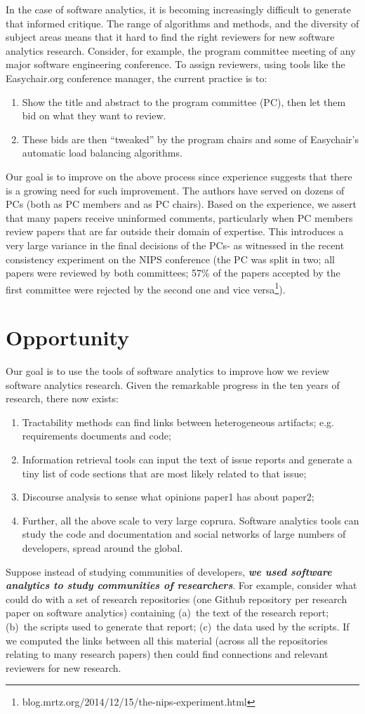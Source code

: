 \documentclass[journal]{IEEEtran}
\newcommand{\be}{\begin{enumerate}}
\newcommand{\ee}{\end{enumerate}}
\begin{document}
In the case of software analytics, it is becoming increasingly difficult
to generate that informed critique. The range of algorithms and methods,
and the diversity of subject areas means that it hard to find the right
reviewers for new software analytics research.  Consider, for example, 
the program committee meeting of any major software
engineering conference. To assign reviewers, using tools
like the Easychair.org conference manager, the current practice is to:
\be
\item
Show the title and abstract to the program committee (PC), then let them bid on what they want to review. 
\item
These bids are then ``tweaked'' by the program chairs
and some of Easychair's automatic load balancing algorithms.
\ee
Our goal is to improve on the above process since
experience suggests that there is a growing need for such improvement.
The authors have served on dozens of PCs
(both as  PC members and as PC chairs). Based on the experience, we assert that many papers
receive uninformed
comments, particularly when PC members   review papers that are far outside their domain of expertise.
This introduces a very large variance in the final decisions of the PCs- as witnessed in the  recent  
consistency experiment on the NIPS conference (the PC was split in two; all papers were reviewed by both committees; 57\% of the papers accepted by the first committee were rejected by the second one and vice versa\footnote{blog.mrtz.org/2014/12/15/the-nips-experiment.html}).


\section{Opportunity}
Our  goal is to use the tools of software analytics to improve how we review
software analytics research. 
Given  the remarkable progress  in the ten years of research, 
there now exists:
\be
\item
Tractability methods can find links between heterogeneous artifacts; e.g. requirements
documents and code;
\item
Information retrieval tools can input  the text of issue reports and generate a tiny
list of code sections that are most likely related to that issue;
\item
Discourse analysis to sense what opinions paper1 has about paper2;
\item
Further,   all the above scale to very large coprura. Software analytics tools can  study the code and documentation and social networks
of large numbers of developers, spread around the global.
\ee
Suppose instead of studying communities of developers, {\bf {\em we
used software analytics to study communities of researchers}}.
For example, consider what {\IT} could do   with
a set of research  repositories (one Github repository per  research paper 
on software analytics) containing
(a)~the text of the research report;
(b)~the scripts used to generate that report;
(c)~the data used by the scripts. 
If we computed the links between all this material
(across all the repositories relating to many research papers) then
{\IT}  could find connections and relevant reviewers for
new research. 
\end{document}
